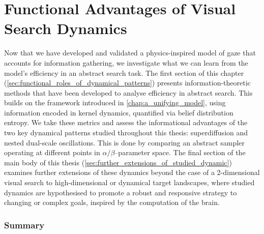 \chapter{Functional Advantages of Visual Search Dynamics}\label{chap:functional_advantages}
Now that we have developed and validated a physics-inspired model of gaze that accounts for information gathering, we investigate what we can learn from the model's efficiency in an abstract search task. The first section of this chapter (\cref{sec:functional_roles_of_dynamical_patterns}) presents information-theoretic methods that have been developed to analyse efficiency in abstract search. This builds on the framework introduced in \cref{chap:a_unifying_model}, using information encoded in kernel dynamics, quantified via belief distribution entropy. We take these metrics and assess the informational advantages of the two key dynamical patterns studied throughout this thesis: superdiffusion and nested dual-scale oscillations. This is done by comparing an abstract sampler operating at different points in $\alpha/\beta$--parameter space. The final section of the main body of this thesis (\cref{sec:further_extensions_of_studied_dynamic}) examines further extensions of these dynamics beyond the case of a 2-dimensional visual search to high-dimensional or dynamical target landscapes, where studied dynamics are hypothesised to promote a robust and responsive strategy to changing or complex goals, inspired by the computation of the brain.
%






\subsection*{Summary}

